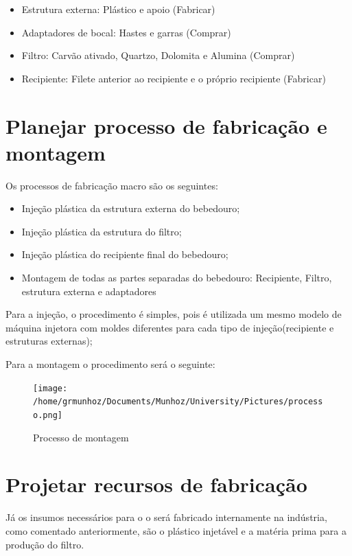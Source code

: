 \documentclass[
	12pt,				%
	openright,			%
	oneside,			%
	a4paper,			%
	english,			%
	french,				%
	spanish,			%
	brazil				%
	]{abntex2}
\begin{document}
\begin{itemize}
\item Estrutura externa: Plástico e apoio (Fabricar)
\item Adaptadores de bocal: Hastes e garras (Comprar)
\item Filtro: Carvão ativado,  Quartzo, Dolomita e Alumina (Comprar)
\item Recipiente: Filete anterior ao recipiente e o próprio recipiente (Fabricar)
\end{itemize}


\section{Planejar processo de fabricação e montagem}

Os processos de fabricação macro são os seguintes:

\begin{itemize}
\item Injeção plástica da estrutura externa do bebedouro;
\item Injeção plástica da estrutura do filtro;
\item Injeção plástica do recipiente final do bebedouro;
\item Montagem de todas as partes separadas do bebedouro: Recipiente, Filtro, estrutura externa e adaptadores
\end{itemize} 
	
Para a injeção, o procedimento é simples, pois é utilizada um mesmo modelo de máquina injetora com moldes diferentes para cada tipo de injeção(recipiente e estruturas externas);

Para a montagem o procedimento será o seguinte:
\begin{figure}[H]
\begin{center}
\caption{Processo de montagem}
\texttt{[image: /home/grmunhoz/Documents/Munhoz/University/Pictures/processo.png]} 
\label{figetapas}
\end{center}
\end{figure}

\section{Projetar recursos de fabricação}

Já os insumos necessários para o o será fabricado internamente na indústria, como comentado anteriormente, são o plástico injetável e a matéria prima para a produção do filtro. 
\end{document}
